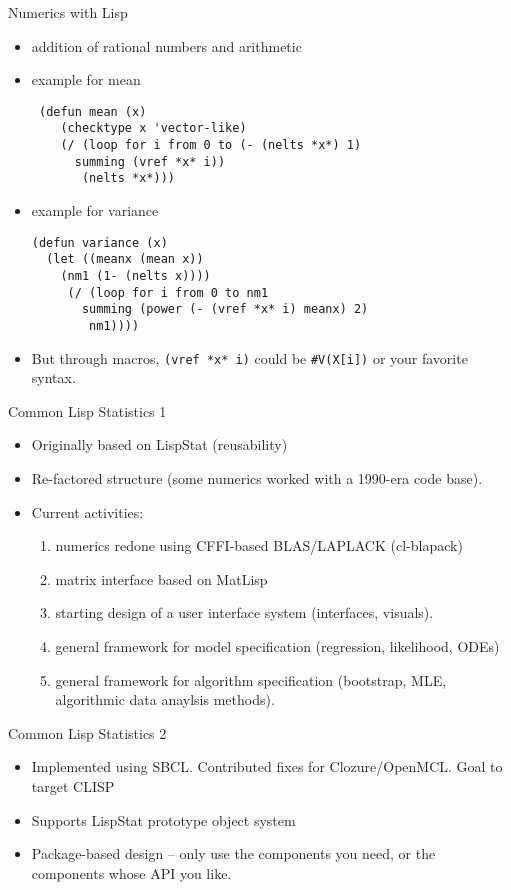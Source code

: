\documentclass{beamer}
\begin{document}
\begin{frame}[fragile]{Numerics with Lisp}
  \begin{itemize}
  \item addition of rational numbers and arithmetic
  \item example for mean
\begin{verbatim}
 (defun mean (x)
    (checktype x 'vector-like)
    (/ (loop for i from 0 to (- (nelts *x*) 1)
	  summing (vref *x* i))
       (nelts *x*)))
\end{verbatim}
  \item example for variance
\begin{verbatim}
(defun variance (x)
  (let ((meanx (mean x))
	(nm1 (1- (nelts x))))
     (/ (loop for i from 0 to nm1
	   summing (power (- (vref *x* i) meanx) 2)
        nm1))))
\end{verbatim}
  \item But through macros, \verb+(vref *x* i)+ could be
    \verb+#V(X[i])+ or your favorite syntax.
  \end{itemize}
  
\end{frame}


\begin{frame}{Common Lisp Statistics 1}
  \begin{itemize}
  \item Originally based on LispStat (reusability)
  \item Re-factored structure (some numerics worked with a 1990-era code base). 
  \item Current activities:
    \begin{enumerate}
    \item numerics redone using CFFI-based BLAS/LAPLACK (cl-blapack)
    \item matrix interface based on MatLisp
    \item starting design of a user interface system (interfaces,
      visuals).
    \item general framework for model specification (regression,
      likelihood, ODEs)
    \item general framework for algorithm specification (bootstrap,
      MLE, algorithmic data anaylsis methods).
    \end{enumerate}
  \end{itemize}
\end{frame}

\begin{frame}{Common Lisp Statistics 2}

  \begin{itemize}
  \item Implemented using SBCL.  Contributed fixes for
    Clozure/OpenMCL. Goal to target CLISP
  \item Supports LispStat prototype object system
  \item Package-based design -- only use the components you need, or
    the components whose API you like.
  \end{itemize}
\end{frame}
\end{document}
